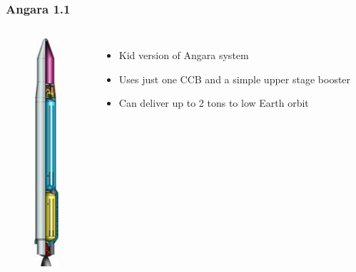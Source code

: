 \documentclass[onlymath]{beamer}
\newcommand\tw\textwidth
\begin{document}
\begin{frame}
  \frametitle{Angara 1.1}
  \begin{columns}
    \column{.2\tw}
    \begin{figure}
      \centering
      \includegraphics[scale=0.4]{Angara-1.1-scheme.jpg}
    \end{figure}
    \column{.8\tw}
    \begin{itemize}
    \item Kid version of Angara system
    \item Uses just one CCB and a simple upper stage booster
    \item Can deliver up to 2 tons to low Earth orbit
    \end{itemize}
  \end{columns}
\end{frame}
\end{document}
